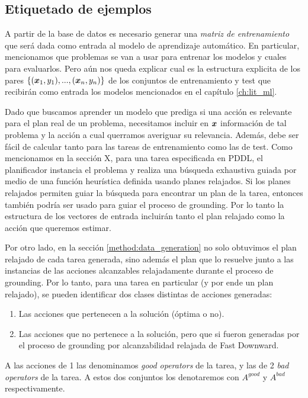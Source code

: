 \subsection{Etiquetado de ejemplos}

A partir de la base de datos es necesario generar una \emph{matriz de
entrenamiento} que será dada como entrada al modelo de aprendizaje automático.
En particular, mencionamos que problemas se van a usar para entrenar los modelos
y cuales para evaluarlos. Pero aún nos queda explicar cual es la estructura
explicita de los pares $\{(\boldsymbol{x}_1, y_1), ..., (\boldsymbol{x}_n, y_n)\}$ de los
conjuntos de entrenamiento y test que recibirán como entrada los modelos
mencionados en el capítulo \ref{ch:lit_ml}.

Dado que buscamos aprender un modelo que prediga si una acción es relevante para
el plan real de un problema, necesitamos incluir en $\boldsymbol{x}$ información de
tal problema y la acción a cual querramos averiguar su relevancia. Además, debe
ser fácil de calcular tanto para las tareas de entrenamiento como las de test.
Como mencionamos en la sección X, para una tarea especificada en PDDL, el
planificador instancia el problema y realiza una búsqueda exhaustiva guiada por
medio de una función heurística definida usando planes relajados. Si los planes
relajados permiten guiar la búsqueda para encontrar un plan de la tarea,
entonces también podría ser usado para guiar el proceso de grounding. Por lo
tanto la estructura de los vectores de entrada incluirán tanto el plan relajado
como la acción que queremos estimar.

Por otro lado, en la sección \ref{method:data_generation} no solo obtuvimos el
plan relajado de cada tarea generada, sino además el plan que lo resuelve junto
a las instancias de las acciones alcanzables relajadamente durante el proceso de
grounding. Por lo tanto, para una tarea en particular (y por ende un plan
relajado), se pueden identificar dos clases distintas de acciones generadas:

\begin{enumerate}
    \item Las acciones que pertenecen a la solución (óptima o no).
    \item Las acciones que no pertenece a la solución, pero que si fueron
    generadas por el proceso de grounding por alcanzabilidad relajada de Fast
    Downward.
\end{enumerate}

A las acciones de 1 las denominamos \emph{good operators} de la tarea, y las de
2 \emph{bad operators} de la tarea. A estos dos conjuntos los denotaremos con
$A^{good}$ y $A^{bad}$ respectivamente.

